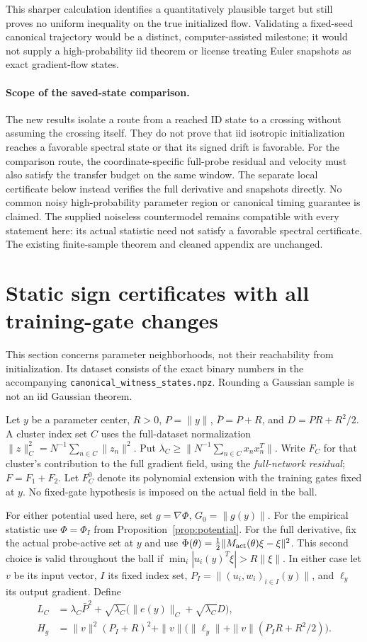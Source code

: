 \documentclass[10pt]{article}
\begin{document}
This sharper calculation identifies a quantitatively plausible target but
still proves no uniform inequality on the true initialized flow. Validating a
fixed-seed canonical trajectory would be a distinct, computer-assisted milestone;
it would not supply a high-probability iid theorem or license treating Euler
snapshots as exact gradient-flow states.

\paragraph{Scope of the saved-state comparison.}
The new results isolate a route from a reached ID state to a crossing without
assuming the crossing itself. They do not prove that iid isotropic initialization
reaches a favorable spectral state or that its signed drift is favorable.
For the comparison route, the coordinate-specific full-probe residual and velocity
must also satisfy the transfer budget on the same window. The separate local
certificate below instead verifies the full derivative and snapshots directly. No common noisy
high-probability parameter region or canonical timing guarantee is claimed.
The supplied noiseless countermodel remains compatible with every statement
here: its actual statistic need not satisfy a favorable spectral certificate.
The existing finite-sample theorem and cleaned appendix are unchanged.
\section{Static sign certificates with all training-gate changes}
\label{sec:static}
This section concerns parameter neighborhoods, not their reachability from
initialization. Its dataset consists of the exact binary numbers in the
accompanying \texttt{canonical\_witness\_states.npz}. Rounding a Gaussian
sample is not an iid Gaussian theorem.

Let $y$ be a parameter center, $R>0$, $P=\|y\|$, $\bar P=P+R$, and
$D=PR+R^2/2$. A cluster index set $C$ uses the full-dataset normalization
$\|z\|_C^2=N^{-1}\sum_{n\in C}\|z_n\|^2$. Put
$\lambda_C\ge\|N^{-1}\sum_{n\in C}x_nx_n^T\|$.
Write $F_C$ for that cluster's contribution to the full gradient field,
using the \emph{full-network residual}; $F=F_1+F_2$.
Let $F_C^0$ denote its polynomial extension with the training gates fixed
at $y$. No fixed-gate hypothesis is imposed on the actual field in the ball.

For either potential used here, set $g=\nabla\Phi$, $G_0=\|g(y)\|$.
For the empirical statistic use $\Phi=\Phi_I$ from
Proposition~\ref{prop:potential}. For the full derivative, fix the actual
probe-active set at $y$ and use
$\Phi(\theta)=\frac12\|M_{\rm act}(\theta)\xi-\xi\|^2$.
This second choice is valid throughout the ball if
$\min_i|u_i(y)^T\xi|>R\|\xi\|$.
In either case let $v$ be its input vector, $I$ its fixed index set,
$P_I=\|(u_i,w_i)_{i\in I}(y)\|$, and $\ell_y$ its output gradient.
Define
\begin{align*}
 L_C&=\lambda_C\bar P^2+
 \sqrt{\lambda_C}\big(\|e(y)\|_C+\sqrt{\lambda_C}D\big),\\
 H_g&=\|v\|^2(P_I+R)^2+
 \|v\|\big(\|\ell_y\|+\|v\|(P_IR+R^2/2)\big).
\end{align*}
\end{document}
